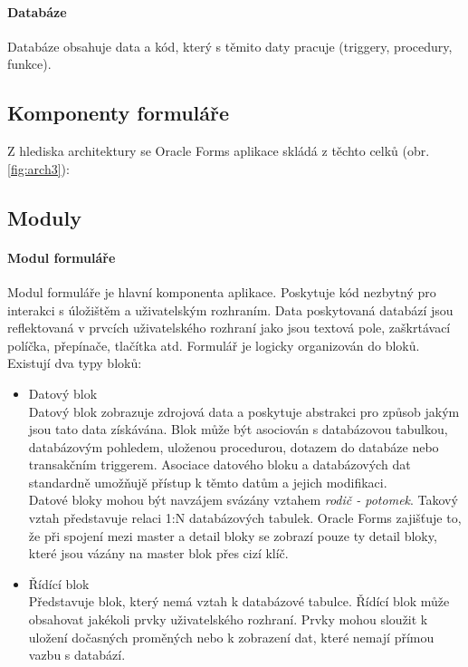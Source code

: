 \documentclass{diplomka}
\begin{document}
\paragraph{Databáze}
Databáze obsahuje data a kód, který s těmito daty pracuje (triggery, procedury, funkce). 

\newpage
\subsection{Komponenty formuláře}
\label{components}
Z hlediska architektury se Oracle Forms aplikace skládá z těchto celků (obr. \ref{fig:arch3}):

\subsection*{Moduly}

\paragraph{Modul formuláře} 
Modul formuláře je hlavní komponenta aplikace. Poskytuje kód nezbytný pro interakci s úložištěm a uživatelským rozhraním. 
Data poskytovaná databází jsou reflektovaná v prvcích uživatelského rozhraní jako jsou textová pole, zaškrtávací políčka, přepínače, tlačítka atd. Formulář je logicky organizován do bloků. Existují dva typy bloků: 
\begin{itemize}
\item Datový blok\\ Datový blok zobrazuje zdrojová data a poskytuje abstrakci pro způsob jakým jsou tato data získávána. Blok může být asociován s databázovou tabulkou, databázovým pohledem, uloženou procedurou, dotazem do databáze nebo transakčním triggerem. Asociace datového bloku a databázových dat standardně umožňujě přístup k těmto datům a jejich modifikaci.\\ \indent
Datové bloky mohou být navzájem svázány vztahem \emph{rodič - potomek}. Takový vztah představuje relaci 1:N databázových tabulek. Oracle Forms zajišťuje to, že při spojení mezi master a detail bloky se zobrazí pouze ty detail bloky, které jsou vázány na master blok přes cizí klíč. 

\item Řídící blok \\
Představuje blok, který nemá vztah k databázové tabulce. Řídící blok může obsahovat jakékoli prvky uživatelského rozhraní. Prvky mohou sloužit k uložení dočasných proměných nebo k zobrazení dat, které nemají přímou vazbu s databází. 
\end{itemize}
\end{document}
